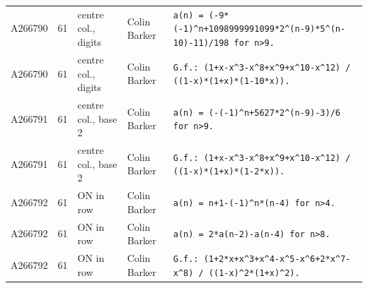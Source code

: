 \documentclass[11pt]{article}
\theoremstyle{definition}
\theoremstyle{remark}
\begin{document}
{\begin{longtable}{p{1.3cm}p{0.7cm}p{2.4cm}p{2.3cm}p{7.3cm}}
A266790 & 61 & centre col., digits & Colin Barker & \texttt{a(n)\allowbreak{} \allowbreak{}=\allowbreak{} \allowbreak{}(-\allowbreak{}9*\allowbreak{}(-\allowbreak{}1)\allowbreak{}\^{}n+\allowbreak{}1098999991099*\allowbreak{}2\^{}(n-\allowbreak{}9)\allowbreak{}*\allowbreak{}5\^{}(n-\allowbreak{}10)\allowbreak{}-\allowbreak{}11)\allowbreak{}/\allowbreak{}198 \allowbreak{}for \allowbreak{}n>9.} \\
A266790 & 61 & centre col., digits & Colin Barker & \texttt{G.f.: \allowbreak{}(1+\allowbreak{}x-\allowbreak{}x\^{}3-\allowbreak{}x\^{}8+\allowbreak{}x\^{}9+\allowbreak{}x\^{}10-\allowbreak{}x\^{}12)\allowbreak{} \allowbreak{}/\allowbreak{} \allowbreak{}((1-\allowbreak{}x)\allowbreak{}*\allowbreak{}(1+\allowbreak{}x)\allowbreak{}*\allowbreak{}(1-\allowbreak{}10*\allowbreak{}x)\allowbreak{})\allowbreak{}.} \\
A266791 & 61 & centre col., base 2 & Colin Barker & \texttt{a(n)\allowbreak{} \allowbreak{}=\allowbreak{} \allowbreak{}(-\allowbreak{}(-\allowbreak{}1)\allowbreak{}\^{}n+\allowbreak{}5627*\allowbreak{}2\^{}(n-\allowbreak{}9)\allowbreak{}-\allowbreak{}3)\allowbreak{}/\allowbreak{}6 \allowbreak{}for \allowbreak{}n>9.} \\
A266791 & 61 & centre col., base 2 & Colin Barker & \texttt{G.f.: \allowbreak{}(1+\allowbreak{}x-\allowbreak{}x\^{}3-\allowbreak{}x\^{}8+\allowbreak{}x\^{}9+\allowbreak{}x\^{}10-\allowbreak{}x\^{}12)\allowbreak{} \allowbreak{}/\allowbreak{} \allowbreak{}((1-\allowbreak{}x)\allowbreak{}*\allowbreak{}(1+\allowbreak{}x)\allowbreak{}*\allowbreak{}(1-\allowbreak{}2*\allowbreak{}x)\allowbreak{})\allowbreak{}.} \\
A266792 & 61 & ON in row & Colin Barker & \texttt{a(n)\allowbreak{} \allowbreak{}=\allowbreak{} \allowbreak{}n+\allowbreak{}1-\allowbreak{}(-\allowbreak{}1)\allowbreak{}\^{}n*\allowbreak{}(n-\allowbreak{}4)\allowbreak{} \allowbreak{}for \allowbreak{}n>4.} \\
A266792 & 61 & ON in row & Colin Barker & \texttt{a(n)\allowbreak{} \allowbreak{}=\allowbreak{} \allowbreak{}2*\allowbreak{}a(n-\allowbreak{}2)\allowbreak{}-\allowbreak{}a(n-\allowbreak{}4)\allowbreak{} \allowbreak{}for \allowbreak{}n>8.} \\
A266792 & 61 & ON in row & Colin Barker & \texttt{G.f.: \allowbreak{}(1+\allowbreak{}2*\allowbreak{}x+\allowbreak{}x\^{}3+\allowbreak{}x\^{}4-\allowbreak{}x\^{}5-\allowbreak{}x\^{}6+\allowbreak{}2*\allowbreak{}x\^{}7-\allowbreak{}x\^{}8)\allowbreak{} \allowbreak{}/\allowbreak{} \allowbreak{}((1-\allowbreak{}x)\allowbreak{}\^{}2*\allowbreak{}(1+\allowbreak{}x)\allowbreak{}\^{}2)\allowbreak{}.} \\

\end{longtable}}
\end{document}

